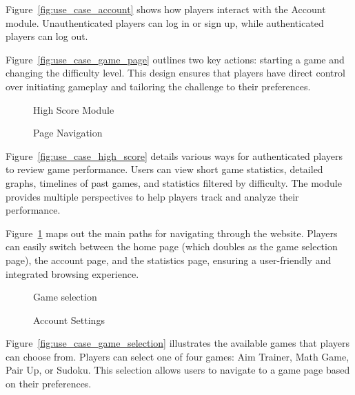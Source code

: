 \documentclass[11pt,a4paper]{article}
\newcommand{\inputdiagram}[1]{}
\newcommand{\textwidthdiagram}[2][1]{%
  \resizebox{#1\textwidth}{!}{\inputdiagram{#2}}%
}
\begin{document}
Figure~\ref{fig:use_case_account} shows how players interact with the Account module.
Unauthenticated players can log in or sign up, while authenticated players can log out.

Figure~\ref{fig:use_case_game_page} outlines two key actions: starting a game and
changing the difficulty level. This design ensures that players have direct
control over initiating gameplay and tailoring the challenge to their
preferences.

\begin{figure}[H]
    \centering
    \begin{minipage}[b]{0.48\textwidth}
        \textwidthdiagram{use_case_high_score.tex}
        \caption{High Score Module}
        \label{fig:use_case_high_score}
    \end{minipage}
    \hfil
    \begin{minipage}[b]{0.48\textwidth}
        \centering
        \textwidthdiagram{use_case_navigation.tex}
        \caption{Page Navigation}
        \label{fig:use_case_navigation}
    \end{minipage}
\end{figure}

Figure~\ref{fig:use_case_high_score} details various ways for authenticated players to review game performance. Users
can view short game statistics, detailed graphs, timelines of past games, and
statistics filtered by difficulty. The module provides multiple perspectives to
help players track and analyze their performance.

Figure~\ref{fig:use_case_navigation} maps out the main paths for navigating through the website.
Players can easily switch between the home page (which doubles as the game
selection page), the account page, and the statistics page, ensuring a
user-friendly and integrated browsing experience.

\begin{figure}[H]
    \begin{minipage}[b]{0.48\textwidth}
        \centering
        \textwidthdiagram{use_case_game_selection.tex}
        \caption{Game selection}
        \label{fig:use_case_game_selection}
    \end{minipage}
    \hfil
    \begin{minipage}[b]{0.48\textwidth}
        \centering
        \textwidthdiagram{use_case_settings.tex}
        \caption{Account Settings}
        \label{fig:use_case_settings}
    \end{minipage}
\end{figure}
Figure~\ref{fig:use_case_game_selection} illustrates the available games that
players can choose from. Players can select one of four games: Aim Trainer,
Math Game, Pair Up, or Sudoku. This selection allows users to navigate to
a game page based on their preferences.
\end{document}
